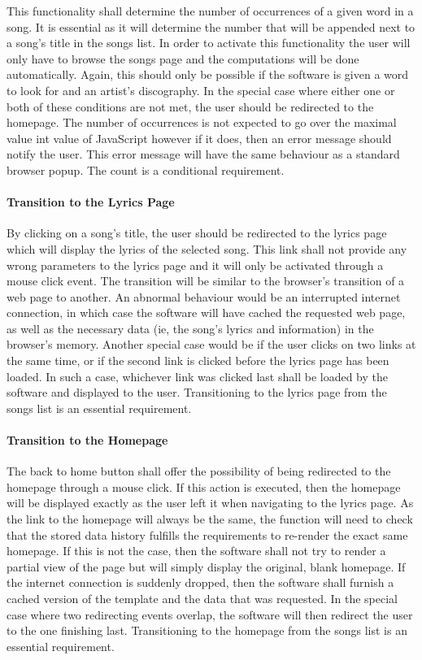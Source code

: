 \documentclass[]{article}
\begin{document}
This functionality shall determine the number of occurrences of a given
word in a song. It is essential as it will determine the number that
will be appended next to a song's title in the songs list. In order to
activate this functionality the user will only have to browse the songs
page and the computations will be done automatically. Again, this should
only be possible if the software is given a word to look for and an
artist's discography. In the special case where either one or both of
these conditions are not met, the user should be redirected to the
homepage. The number of occurrences is not expected to go over the
maximal value int value of JavaScript however if it does, then an error
message should notify the user. This error message will have the same
behaviour as a standard browser popup. The count is a conditional
requirement.

\paragraph{Transition to the Lyrics
Page}\label{transition-to-the-lyrics-page}

By clicking on a song's title, the user should be redirected to the
lyrics page which will display the lyrics of the selected song. This
link shall not provide any wrong parameters to the lyrics page and it
will only be activated through a mouse click event. The transition will
be similar to the browser's transition of a web page to another. An
abnormal behaviour would be an interrupted internet connection, in which
case the software will have cached the requested web page, as well as
the necessary data (ie, the song's lyrics and information) in the
browser's memory. Another special case would be if the user clicks on
two links at the same time, or if the second link is clicked before the
lyrics page has been loaded. In such a case, whichever link was clicked
last shall be loaded by the software and displayed to the user.
Transitioning to the lyrics page from the songs list is an essential
requirement.

\paragraph{Transition to the Homepage}\label{transition-to-the-homepage}

The back to home button shall offer the possibility of being redirected
to the homepage through a mouse click. If this action is executed, then
the homepage will be displayed exactly as the user left it when
navigating to the lyrics page. As the link to the homepage will always
be the same, the function will need to check that the stored data
history fulfills the requirements to re-render the exact same homepage.
If this is not the case, then the software shall not try to render a
partial view of the page but will simply display the original, blank
homepage. If the internet connection is suddenly dropped, then the
software shall furnish a cached version of the template and the data
that was requested. In the special case where two redirecting events
overlap, the software will then redirect the user to the one finishing
last. Transitioning to the homepage from the songs list is an essential
requirement.
\end{document}
